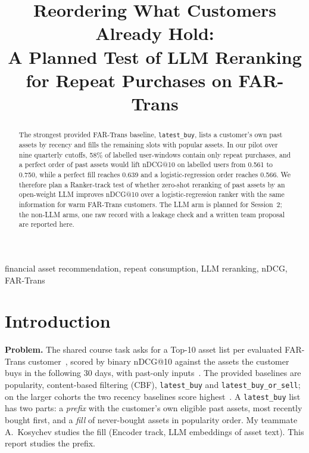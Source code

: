 \documentclass[conference]{IEEEtran}
\begin{document}
\title{Reordering What Customers Already Hold:\\A Planned Test of LLM Reranking for Repeat Purchases on FAR-Trans}

\author{
}

\maketitle

\begin{abstract}
The strongest provided FAR-Trans baseline, \texttt{latest\_buy}, lists a customer's own past assets by recency and fills the remaining slots with popular assets. In our pilot over nine quarterly cutoffs, 58\% of labelled user-windows contain only repeat purchases, and a perfect order of past assets would lift nDCG@10 on labelled users from 0.561 to 0.750, while a perfect fill reaches 0.639 and a logistic-regression order reaches 0.566. We therefore plan a Ranker-track test of whether zero-shot reranking of past assets by an open-weight LLM improves nDCG@10 over a logistic-regression ranker with the same information for warm FAR-Trans customers. The LLM arm is planned for Session~2; the non-LLM arms, one raw record with a leakage check and a written team proposal are reported here.
\end{abstract}

\begin{IEEEkeywords}
financial asset recommendation, repeat consumption, LLM reranking, nDCG, FAR-Trans
\end{IEEEkeywords}

\section{Introduction}

\textbf{Problem.} The shared course task asks for a Top-10 asset list per evaluated FAR-Trans customer~\cite{farTrans}, scored by binary nDCG@10 against the assets the customer buys in the following 30 days, with past-only inputs~\cite{starter}. The provided baselines are popularity, content-based filtering (CBF), \texttt{latest\_buy} and \texttt{latest\_buy\_or\_sell}; on the larger cohorts the two recency baselines score highest~\cite{starter}. A \texttt{latest\_buy} list has two parts: a \emph{prefix} with the customer's own eligible past assets, most recently bought first, and a \emph{fill} of never-bought assets in popularity order. My teammate A.~Kosychev studies the fill (Encoder track, LLM embeddings of asset text). This report studies the prefix.
\end{document}

